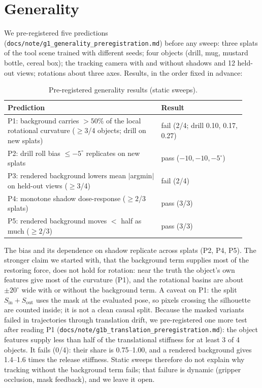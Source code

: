 \documentclass[conference]{IEEEtran}
\begin{document}
\section{Generality}\label{sec:g1}
We pre-registered five predictions (\nolinkurl{docs/note/g1_generality_preregistration.md}) before any sweep: three
splats of the tool scene trained with different seeds; four objects (drill, mug, mustard bottle, cereal box);
the tracking camera with and without shadows and 12 held-out views; rotations about three axes. Results, in the
order fixed in advance:
\begin{table}[t]\centering\caption{Pre-registered generality results (static sweeps).}\label{tab:g1}
\small\begin{tabular}{@{}p{0.6\linewidth}p{0.33\linewidth}@{}}\toprule Prediction & Result\\\midrule
P1: background carries $>50\%$ of the local rotational curvature ($\geq3$/4 objects; drill on new splats) & fail (2/4; drill 0.10, 0.17, 0.27)\\
P2: drill roll bias $\leq-5^\circ$ replicates on new splats & pass ($-10, -10, -5^\circ$)\\
P3: rendered background lowers mean $|$argmin$|$ on held-out views ($\geq3$/4) & fail (2/4)\\
P4: monotone shadow dose-response ($\geq2$/3 splats) & pass (3/3)\\
P5: rendered background moves $<$ half as much ($\geq2$/3) & pass (3/3)\\\bottomrule
\end{tabular}\end{table}
The bias and its dependence on shadow replicate across splats (P2, P4, P5). The stronger claim we started with, that
the background term supplies most of the restoring force, does not hold for rotation: near the truth the object's
own features give most of the curvature (P1), and the rotational basins are about $\pm20^\circ$ wide with or without
the background term. A caveat on P1: the split $S_\text{in}+S_\text{out}$ uses the mask at the evaluated pose, so
pixels crossing the silhouette are counted inside; it is not a clean causal split. Because the masked variants failed in trajectories through translation drift, we pre-registered one more test
after reading P1 (\nolinkurl{docs/note/g1b_translation_preregistration.md}): the object features supply less than
half of the translational stiffness for at least 3 of 4 objects. It fails (0/4): their share is 0.75--1.00, and a
rendered background gives 1.4--1.6 times the release stiffness. Static sweeps therefore do not explain why tracking
without the background term fails; that failure is dynamic (gripper occlusion, mask feedback), and we leave it open.
\end{document}

